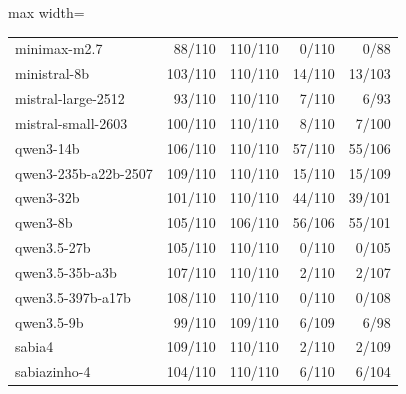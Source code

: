\begin{table}[htbp]
\begin{adjustbox}{max width=\linewidth}
\begin{tabular}{lrrrr}
minimax-m2.7 & 88/110 & 110/110 & 0/110 & 0/88 \\
ministral-8b & 103/110 & 110/110 & 14/110 & 13/103 \\
mistral-large-2512 & 93/110 & 110/110 & 7/110 & 6/93 \\
mistral-small-2603 & 100/110 & 110/110 & 8/110 & 7/100 \\
qwen3-14b & 106/110 & 110/110 & 57/110 & 55/106 \\
qwen3-235b-a22b-2507 & 109/110 & 110/110 & 15/110 & 15/109 \\
qwen3-32b & 101/110 & 110/110 & 44/110 & 39/101 \\
qwen3-8b & 105/110 & 106/110 & 56/106 & 55/101 \\
qwen3.5-27b & 105/110 & 110/110 & 0/110 & 0/105 \\
qwen3.5-35b-a3b & 107/110 & 110/110 & 2/110 & 2/107 \\
qwen3.5-397b-a17b & 108/110 & 110/110 & 0/110 & 0/108 \\
qwen3.5-9b & 99/110 & 109/110 & 6/109 & 6/98 \\
sabia4 & 109/110 & 110/110 & 2/110 & 2/109 \\
sabiazinho-4 & 104/110 & 110/110 & 6/110 & 6/104 \\
\bottomrule
\end{tabular}
\end{adjustbox}
\end{table}

